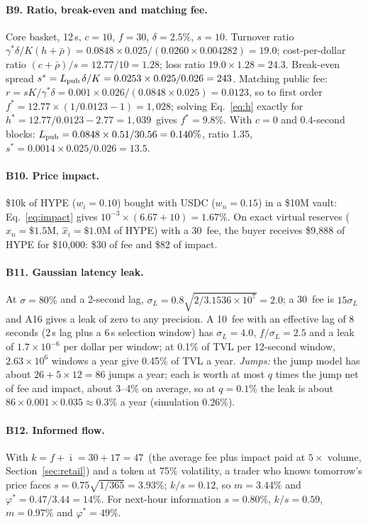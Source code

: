 \paragraph{B9. Ratio, break-even and matching fee.} Core basket, 12\,s, $c=10$\bps, $f=30$\bps, $\delta=2.5\%$, $s=10$\bps. Turnover ratio $\gamma^{*}\delta/K(h+\bar\rho)=0.0848\times0.025/(0.0260\times0.004282)=19.0$; cost-per-dollar ratio $(c+\bar\rho)/s=12.77/10=1.28$; loss ratio $19.0\times1.28=24.3$. Break-even spread $s^{*}=L_{\mathrm{pub}}\,\delta/K=0.0253\times0.025/0.026=243$\bps. Matching public fee: $r=sK/\gamma^{*}\delta=0.001\times0.026/(0.0848\times0.025)=0.0123$, so to first order $f^{*}=12.77\times(1/0.0123-1)=1{,}028$\bps; solving Eq.~\eqref{eq:h} exactly for $h^{*}=12.77/0.0123-2.77=1{,}039$\bps\ gives $f^{*}=9.8\%$. With $c=0$ and 0.4-second blocks: $L_{\mathrm{pub}}=0.0848\times0.51/30.56=0.140\%$, ratio 1.35, $s^{*}=0.0014\times0.025/0.026=13.5$\bps.

\paragraph{B10. Price impact.} \$10k of HYPE ($w_i=0.10$) bought with USDC ($w_n=0.15$) in a \$10M vault: Eq.~\eqref{eq:impact} gives $10^{-3}\times(6.67+10)=1.67\%$. On exact virtual reserves ($\hat x_n=\$1.5$M, $\hat x_i=\$1.0$M of HYPE) with a 30\bps\ fee, the buyer receives \$9{,}888 of HYPE for \$10{,}000: \$30 of fee and \$82 of impact.

\paragraph{B11. Gaussian latency leak.} At $\sigma=80\%$ and a 2-second lag, $\sigma_L=0.8\sqrt{2/3.1536\times10^{7}}=2.0$\bps; a 30\bps\ fee is $15\sigma_L$ and A16 gives a leak of zero to any precision. A 10\bps\ fee with an effective lag of 8 seconds (2\,s lag plus a 6\,s selection window) has $\sigma_L=4.0$\bps, $f/\sigma_L=2.5$ and a leak of $1.7\times10^{-6}$ per dollar per window; at 0.1\% of TVL per 12-second window, $2.63\times10^{6}$ windows a year give 0.45\% of TVL a year. \emph{Jumps:} the jump model has about $26+5\times12=86$ jumps a year; each is worth at most $q$ times the jump net of fee and impact, about 3--4\% on average, so at $q=0.1\%$ the leak is about $86\times0.001\times0.035\approx0.3\%$ a year (simulation 0.26\%).

\paragraph{B12. Informed flow.} With $k=f+\bar\imath=30+17=47$\bps\ (the average fee plus impact paid at $5\times$ volume, Section~\ref{sec:retail}) and a token at 75\% volatility, a trader who knows tomorrow's price faces $s=0.75\sqrt{1/365}=3.93\%$; $k/s=0.12$, so $m=3.44\%$ and $\varphi^{*}=0.47/3.44=14\%$. For next-hour information $s=0.80\%$, $k/s=0.59$, $m=0.97\%$ and $\varphi^{*}=49\%$.

